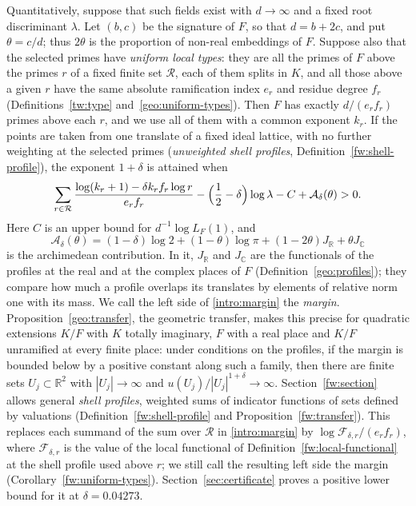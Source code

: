 \documentclass[11pt]{amsart}
\numberwithin{equation}{section}
\theoremstyle{definition}
\theoremstyle{remark}
\newcommand{\R}{\mathbb R}
\newcommand{\C}{\mathbb C}
\newcommand{\deltastar}{0.04273}
\begin{document}
Quantitatively, suppose that such fields exist with $d\to\infty$ and a
fixed root discriminant $\lambda$. Let $(b,c)$ be the signature of $F$,
so that $d=b+2c$, and put $\theta=c/d$; thus $2\theta$ is the proportion
of non-real embeddings of $F$. Suppose also that the selected
primes have \emph{uniform local types}: they are all the primes of $F$
above the primes $r$ of a fixed finite set $\mathcal R$, each of them
splits in $K$, and all those above a given $r$ have the same absolute
ramification index $e_r$ and residue degree $f_r$ (Definitions~\ref{tw:type}
and~\ref{geo:uniform-types}). Then $F$ has exactly $d/(e_rf_r)$ primes
above each $r$, and we use all of them with a common exponent
$k_r$. If the points are taken from one translate
of a fixed ideal lattice, with no further weighting at the selected
primes (\emph{unweighted shell profiles},
Definition~\ref{fw:shell-profile}), the
exponent $1+\delta$ is attained when
\begin{equation}\label{intro:margin}
 \sum_{r\in\mathcal R}\frac{\log(k_r+1)-\delta k_rf_r\log r}{e_rf_r}
 -\Bigl(\frac12-\delta\Bigr)\log\lambda-C+\mathcal A_\delta(\theta)>0.
\end{equation}
Here $C$ is an upper
bound for $d^{-1}\log L_F(1)$, and
\[
 \mathcal A_\delta(\theta)=(1-\delta)\log2+(1-\theta)\log\pi
 +(1-2\theta)J_\R+\theta J_\C
\]
is the archimedean contribution. In it, $J_\R$ and $J_\C$ are the
functionals of the profiles at the real and at the complex places of
$F$ (Definition~\ref{geo:profiles}); they compare how much a profile
overlaps its translates by elements of relative norm one with its mass.
We call the left side of \eqref{intro:margin} the \emph{margin}.
Proposition~\ref{geo:transfer}, the geometric transfer, makes this
precise for quadratic extensions $K/F$ with $K$ totally imaginary, $F$
with a real place and $K/F$ unramified at every finite place: under
conditions on the profiles, if the margin is bounded below by a positive
constant along such a family, then there are finite sets
$U_j\subset\R^2$ with $|U_j|\to\infty$ and
$u(U_j)/|U_j|^{1+\delta}\to\infty$. Section~\ref{fw:section} allows
general \emph{shell profiles}, weighted sums of indicator functions of
sets defined by valuations (Definition~\ref{fw:shell-profile} and
Proposition~\ref{fw:transfer}). This replaces each summand of the sum
over $\mathcal R$ in \eqref{intro:margin} by
$\log\mathcal F_{\delta,r}/(e_rf_r)$, where $\mathcal F_{\delta,r}$ is
the value of the local functional of Definition~\ref{fw:local-functional}
at the shell profile used above $r$; we still call the resulting left
side the margin (Corollary~\ref{fw:uniform-types}).
Section~\ref{sec:certificate} proves a positive lower bound for it at
$\delta=\deltastar$.
\end{document}
